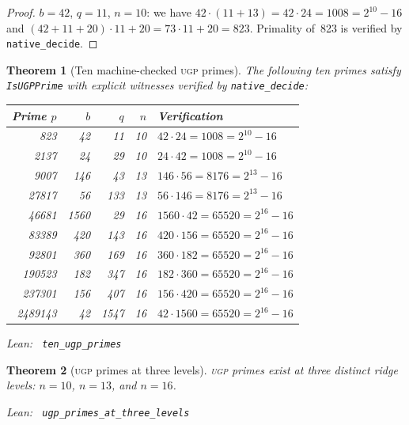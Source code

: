 \documentclass[11pt,a4paper]{article}
\newenvironment{leanref}%
  {\par\smallskip\noindent\begingroup\raggedright\textup{Lean:}~}%
  {\par\endgroup}
\newtheorem{theorem}{Theorem}[section]
\theoremstyle{definition}
\newcommand{\ugp}{\textsc{ugp}}
\begin{document}
\begin{proof}
$b = 42$, $q = 11$, $n = 10$: we have $42 \cdot (11 + 13) = 42 \cdot
24 = 1008 = 2^{10} - 16$ and $(42 + 11 + 20) \cdot 11 + 20 = 73 \cdot
11 + 20 = 823$.  Primality of~823 is verified by \texttt{native\_decide}.
\end{proof}

\begin{theorem}[Ten machine-checked \ugp{} primes]\label{thm:ten-ugp}
The following ten primes satisfy \lstinline|IsUGPPrime| with explicit
witnesses verified by \texttt{native\_decide}:

\begin{center}
\begin{tabular}{@{}rrrrl@{}}
\toprule
\textbf{Prime $p$} & $b$ & $q$ & $n$ & \textbf{Verification} \\
\midrule
823     & 42   & 11   & 10 & $42 \cdot 24 = 1008 = 2^{10}-16$ \\
2137    & 24   & 29   & 10 & $24 \cdot 42 = 1008 = 2^{10}-16$ \\
9007    & 146  & 43   & 13 & $146 \cdot 56 = 8176 = 2^{13}-16$ \\
27817   & 56   & 133  & 13 & $56 \cdot 146 = 8176 = 2^{13}-16$ \\
46681   & 1560 & 29   & 16 & $1560 \cdot 42 = 65520 = 2^{16}-16$ \\
83389   & 420  & 143  & 16 & $420 \cdot 156 = 65520 = 2^{16}-16$ \\
92801   & 360  & 169  & 16 & $360 \cdot 182 = 65520 = 2^{16}-16$ \\
190523  & 182  & 347  & 16 & $182 \cdot 360 = 65520 = 2^{16}-16$ \\
237301  & 156  & 407  & 16 & $156 \cdot 420 = 65520 = 2^{16}-16$ \\
2489143 & 42   & 1547 & 16 & $42 \cdot 1560 = 65520 = 2^{16}-16$ \\
\bottomrule
\end{tabular}
\end{center}

\begin{leanref} \lstinline|ten_ugp_primes|
\end{leanref}
\end{theorem}

\begin{theorem}[\ugp{} primes at three levels]\label{thm:ugp-levels}
\ugp{} primes exist at three distinct ridge levels: $n = 10$, $n = 13$,
and $n = 16$.

\begin{leanref} \lstinline|ugp_primes_at_three_levels|
\end{leanref}
\end{theorem}
\end{document}
